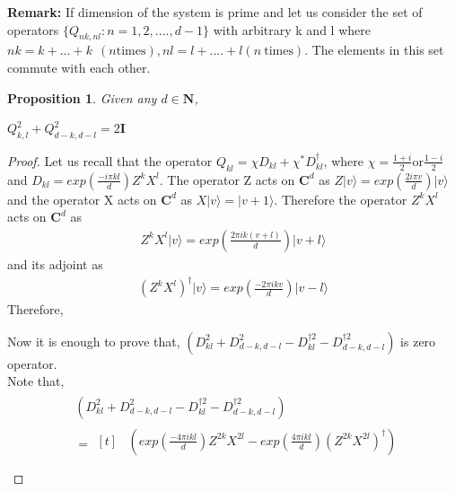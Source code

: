 \documentclass[12pt]{amsart}
\numberwithin{equation}{section}
\newtheorem{proposition}{Proposition}[section]
\begin{document}
\textbf{Remark:} If dimension of the system is prime and let us consider the set of operators $\lbrace Q_{nk,nl}: n=1, 2,...., d-1 \rbrace$ with arbitrary k and l where $nk=k +...+ k~~ (n \text{times}),nl=l +....+ l (n~ \text{times})$. The elements in this set commute with each other. \\



\begin{proposition} \label{p1} Given any $d \in \mathbf{N}$, \\
   \begin{center}
 $ Q_{k,l}^2 + Q_{d-k,d-l}^2 = 2 \mathbf{I}$
\end{center}
\end{proposition}  
    
\begin{proof}
    Let us recall that the operator $Q_{kl}=\chi D_{kl}+\chi^{*} D^{\dagger}_{kl}$, where $\chi=\frac{1+i}{2} \text{or} \frac{1-i}{2}$ and $D_{kl}=exp\left(\frac{-i \pi k l }{d}\right) Z^{k} X^{l}$. The operator Z acts on $\mathbf{C}^d$ as $Z \vert v \rangle = exp\left(\frac{2i \pi v}{d} \right)\vert v \rangle$ and the operator X  acts on $\mathbf{C}^d$ as $X \vert v \rangle = \vert v+1 \rangle.$ Therefore the operator $Z^{k}X^{l}$ acts on $\mathbf{C}^d$ as 
\begin{eqnarray*}
    Z^{k}X^{l} \vert v \rangle = exp \left( \frac{2 \pi i k (v+l)}{d}\right) \vert v + l \rangle
\end{eqnarray*}
and its adjoint as 
\begin{eqnarray*}
    \left(Z^{k}X^{l}\right)^{\dagger} \vert v \rangle = exp \left( \frac{-2 \pi i k v}{d}\right) \vert v - l \rangle
\end{eqnarray*}
Therefore,

Now it is enough to prove that, $\left(D^2_{kl}+D^2_{d-k,d-l}-D^{\dagger2}_{kl}-D^{\dagger2}_{d-k,d-l}\right)$ is zero operator.\\
Note that, 
\begin{eqnarray*}
    \begin{split}
        &\left(D^2_{kl}+D^2_{d-k,d-l}-D^{\dagger2}_{kl}-D^{\dagger2}_{d-k,d-l}\right)\\
        &=\begin{aligned}[t]
        &\left(exp \left( \frac{-4 \pi i k l}{d}\right) Z^{2k}X^{2l} -exp \left( \frac{4 \pi i k l}{d}\right) (Z^{2k}X^{2l})^{\dagger}\right)\\

\end{aligned}
\end{split}
\end{eqnarray*}
\end{proof}
\end{document}
